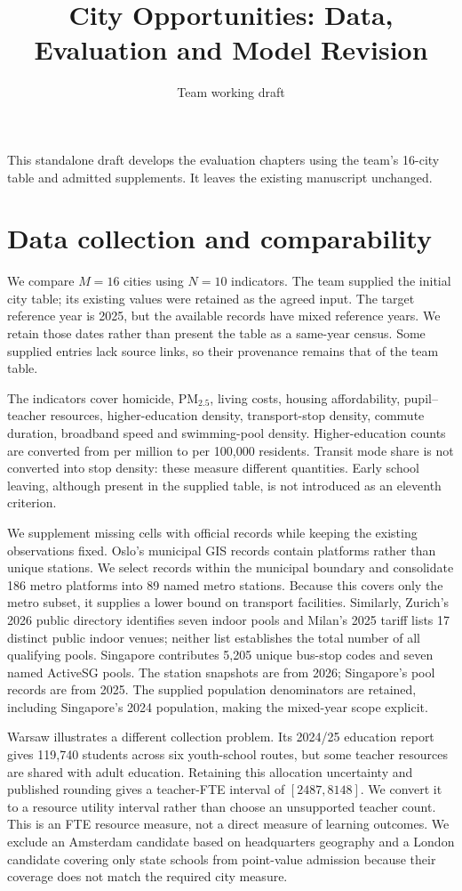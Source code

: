 \documentclass[11pt]{article}
\title{City Opportunities: Data, Evaluation and Model Revision}
\author{Team working draft}
\date{}
\begin{document}
\maketitle
\noindent This standalone draft develops the evaluation chapters using the team's 16-city table and admitted supplements. It leaves the existing manuscript unchanged.
\setcounter{section}{3}
\section{Data collection and comparability}
We compare $M=16$ cities using $N=10$ indicators. The team supplied the initial city table; its existing values were retained as the agreed input. The target reference year is 2025, but the available records have mixed reference years. We retain those dates rather than present the table as a same-year census. Some supplied entries lack source links, so their provenance remains that of the team table.

The indicators cover homicide, PM$_{2.5}$, living costs, housing affordability, pupil--teacher resources, higher-education density, transport-stop density, commute duration, broadband speed and swimming-pool density. Higher-education counts are converted from per million to per 100,000 residents. Transit mode share is not converted into stop density: these measure different quantities. Early school leaving, although present in the supplied table, is not introduced as an eleventh criterion.

We supplement missing cells with official records while keeping the existing observations fixed. Oslo's municipal GIS records contain platforms rather than unique stations. We select records within the municipal boundary and consolidate 186 metro platforms into 89 named metro stations. Because this covers only the metro subset, it supplies a lower bound on transport facilities. Similarly, Zurich's 2026 public directory identifies seven indoor pools and Milan's 2025 tariff lists 17 distinct public indoor venues; neither list establishes the total number of all qualifying pools. Singapore contributes 5,205 unique bus-stop codes and seven named ActiveSG pools. The station snapshots are from 2026; Singapore's pool records are from 2025. The supplied population denominators are retained, including Singapore's 2024 population, making the mixed-year scope explicit.

Warsaw illustrates a different collection problem. Its 2024/25 education report gives 119,740 students across six youth-school routes, but some teacher resources are shared with adult education. Retaining this allocation uncertainty and published rounding gives a teacher-FTE interval of $[2487,8148]$. We convert it to a resource utility interval rather than choose an unsupported teacher count. This is an FTE resource measure, not a direct measure of learning outcomes. We exclude an Amsterdam candidate based on headquarters geography and a London candidate covering only state schools from point-value admission because their coverage does not match the required city measure.
\end{document}
